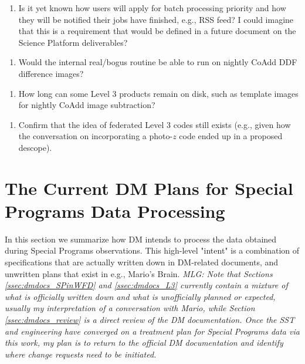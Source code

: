 \documentclass[DM,lsstdraft,toc]{lsstdoc}
\begin{document}
\begin{enumerate}[resume,topsep=-10pt,label= \textbf{Concern \Roman*.}] \item \label{C15} Is it yet known how users will apply for batch processing priority and how they will be notified their jobs have finished, e.g., RSS feed? I could imagine that this is a requirement that would be defined in a future document on the Science Platform deliverables? \end{enumerate}
\begin{enumerate}[resume,topsep=-10pt,label= \textbf{Concern \Roman*.}] \item \label{C16} Would the internal real/bogus routine be able to run on nightly CoAdd DDF difference images? \end{enumerate}
\begin{enumerate}[resume,topsep=-10pt,label= \textbf{Concern \Roman*.}] \item \label{C17} How long can some Level 3 products remain on disk, such as template images for nightly CoAdd image subtraction? \end{enumerate}
\begin{enumerate}[resume,topsep=-10pt,label= \textbf{Concern \Roman*.}] \item \label{C18} Confirm that the idea of federated Level 3 codes still exists (e.g., given how the conversation on incorporating a photo-$z$ code ended up in a proposed descope). \end{enumerate}



\clearpage
\section{The Current DM Plans for Special Programs Data Processing} \label{sec:dmdocs}

In this section we summarize how DM intends to process the data obtained during Special Programs observations. This high-level "intent" is a combination of specifications that are actually written down in DM-related documents, and unwritten plans that exist in e.g., Mario's Brain. {\it MLG: Note that Sections \ref{ssec:dmdocs_SPinWFD} and \ref{ssec:dmdocs_L3} currently contain a mixture of what is officially written down and what is unofficially planned or expected, usually my interpretation of a conversation with Mario, while Section \ref{ssec:dmdocs_review} is a direct review of the DM documentation. Once the SST and engineering have converged on a treatment plan for Special Programs data via this work, my plan is to return to the official DM documentation and identify where change requests need to be initiated.}
\end{document}

